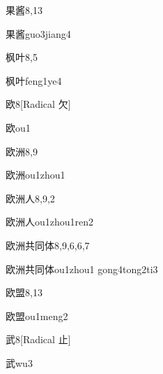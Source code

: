 \begin{entry}{果酱}{8,13}
  \begin{phonetics}{果酱}{guo3jiang4}
  \end{phonetics}
\end{entry}

\begin{entry}{枫叶}{8,5}
  \begin{phonetics}{枫叶}{feng1ye4}
  \end{phonetics}
\end{entry}

\begin{entry}{欧}{8}[Radical 欠]
  \begin{phonetics}{欧}{ou1}
  \end{phonetics}
\end{entry}

\begin{entry}{欧洲}{8,9}
  \begin{phonetics}{欧洲}{ou1zhou1}
  \end{phonetics}
\end{entry}

\begin{entry}{欧洲人}{8,9,2}
  \begin{phonetics}{欧洲人}{ou1zhou1ren2}
  \end{phonetics}
\end{entry}

\begin{entry}{欧洲共同体}{8,9,6,6,7}
  \begin{phonetics}{欧洲共同体}{ou1zhou1 gong4tong2ti3}
  \end{phonetics}
\end{entry}

\begin{entry}{欧盟}{8,13}
  \begin{phonetics}{欧盟}{ou1meng2}
  \end{phonetics}
\end{entry}

\begin{entry}{武}{8}[Radical 止]
  \begin{phonetics}{武}{wu3}
  \end{phonetics}
\end{entry}


